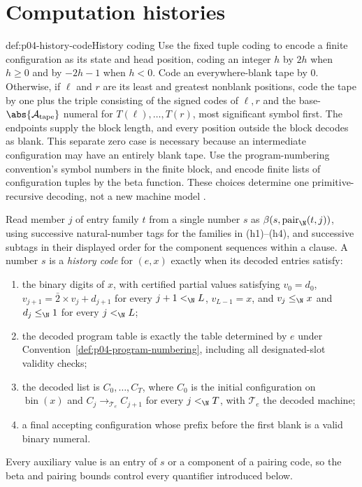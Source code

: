 \section{Computation histories}
\label{sec:p04-computation-histories}

\begin{hbdefinition}{def:p04-history-code}{History coding}
Use the fixed tuple coding to encode a finite configuration as its state and
head position, coding an integer \(h\) by \(2h\) when \(h\geq0\) and by
\(-2h-1\) when \(h<0\).  Code an everywhere-blank tape by \(0\).  Otherwise,
if \(\ell\) and \(r\) are its least and greatest nonblank positions, code the
tape by one plus the triple consisting of the signed codes of \(\ell,r\) and
the base-\(\abs{\mathcal A_{\mathrm{tape}}}\) numeral for
\(T(\ell),\ldots,T(r)\), most significant symbol first.  The endpoints supply
the block length, and every position outside the block decodes as blank.  This
separate zero case is necessary because an intermediate configuration may
have an entirely blank tape.  Use the program-numbering convention's symbol
numbers in the finite block, and encode finite lists of configuration tuples
by the beta function.  These choices determine one primitive-recursive
decoding, not a new machine model
\cite{Shoenfield1967,BoolosBurgessJeffrey2007}.

Read member \(j\) of entry family \(t\) from a single number \(s\) as
\(\beta(s,\operatorname{pair}_{\N}(t,j))\), using successive natural-number
tags for the families in (h1)--(h4), and successive subtags in their displayed
order for the component sequences within a clause.  A number \(s\) is a
\emph{history code}
for \((e,x)\) exactly when its decoded entries satisfy:
\begin{enumerate}
 \item[(h1)] the binary digits of \(x\), with certified partial values satisfying
       \(v_0=d_0\),
       \(v_{j+1}=\bar2\times v_j+d_{j+1}\) for every
       \(j+1<_{\N}L\), \(v_{L-1}=x\), and
       \(v_j\leq_{\N}x\) and \(d_j\leq_{\N}1\) for every
       \(j<_{\N}L\);
 \item[(h2)] the decoded program table is exactly the table determined by
       \(e\) under Convention~\ref{def:p04-program-numbering}, including all
       designated-slot validity checks;
 \item[(h3)] the decoded list is \(C_0,\ldots,C_T\), where \(C_0\) is the
       initial configuration on \(\operatorname{bin}(x)\) and
       \(C_j\longrightarrow_{\mathcal T_e}C_{j+1}\) for every
       \(j<_{\N}T\), with
       \(\mathcal T_e\) the decoded machine;
 \item[(h4)] a final accepting configuration whose prefix before the first blank is
       a valid binary numeral.
\end{enumerate}
Every auxiliary value is an entry of \(s\) or a component of a pairing code,
so the beta and pairing bounds control every quantifier introduced below.
\end{hbdefinition}

